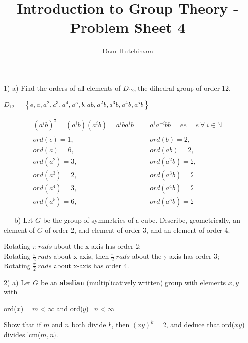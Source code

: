 \documentclass[11pt]{article}
\begin{document}
\title{Introduction to Group Theory - Problem Sheet 4}
\author{Dom Hutchinson}
\maketitle

\begin{flushleft} 1) a) Find the orders of all elements of $\displaystyle{D_{12}}$, the dihedral group of order 12.
\end{flushleft}

\begin{center}
$D_{12}=\left\{e,a,a^2,a^3,a^4,a^5,b,ab,a^2b,a^3b,a^4b,a^5b\right\}$
\end{center}
\begin{eqnarray*}
(a^ib)^2=(a^ib)(a^ib)=a^iba^ib&=&a^ia^{-i}bb=ee=e\ \forall\ i \in \mathbb{N}\\
\\ord(e)=1,&&ord(b)=2,\\
ord(a)=6,&&ord(ab)=2,\\
ord(a^2)=3,&&ord(a^2b)=2,\\
ord(a^3)=2,&&ord(a^3b)=2\\
ord(a^4)=3,&&ord(a^4b)=2\\
ord(a^5)=6,&&ord(a^5b)=2
\end{eqnarray*}

\begin{flushleft}\ \ \  b) Let $G$ be the group of symmetries of a cube. Describe, geometrically, an element of $G$ of order 2, and element of order 3, and an element of order 4.\end{flushleft}

Rotating $\pi\ rads$ about the x-axis has order 2;\\
\indent Rotating $\frac{\pi}{2}\ rads$ about x-axis, then $\frac{\pi}{2}\ rads$ about the y-axis has order 3;\\
\indent Rotating $\frac{\pi}{2}\ rads$ about x-axis has order 4.

\newpage
\begin{flushleft} 2) a) Let $G$ be an \textbf{abelian} (multiplicatively written) group with elements $x,y$ with\\
\begin{center}
ord($x$)$=m<\infty$ and ord($y$)=$n<\infty$
\end{center}
Show that if $m$ and $n$ both divide $k$, then $(xy)^k=2$, and deduce that ord($xy$) divides lcm($m,n$).
\end{flushleft}
\end{document}
